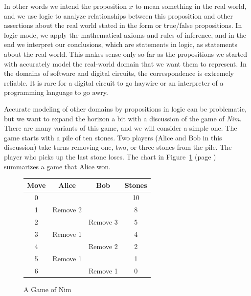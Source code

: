 {{In other words we intend the proposition $x$
to mean something in the real world,
and we use logic to analyze relationships between this proposition and other
assertions about the real world stated in the form or true/false propositions.
In logic mode, we apply the mathematical axioms and rules of inference,
and in the end we interpret our conclusions, which are statements in logic,
as statements about the real world.
This makes sense only so far as the propositions we started with
accurately model the real-world domain that we want them to represent.
In the domains of software and digital circuits,
the correspondence is extremely reliable.
It is rare for a digital circuit to go haywire or an interpreter of
a programming language to go awry.

Accurate modeling of other domains by propositions in logic can be problematic,
but we want to expand the horizon a bit with a discussion
of the game of \emph{Nim}.
There are many variants of this game, and we will consider a simple one.
The game starts with a pile of ten stones. Two players (Alice and Bob in this discussion)
take turns removing one, two, or three stones from the pile.
The player who picks up the last stone loses.
The chart in
Figure~\ref{fig:example-nim-game} (page \pageref{fig:example-nim-game})
summarizes a game that Alice won.

\begin{figure}
\begin{center}
\begin{tabular}{c|c|c|c}
Move & Alice     & Bob      & Stones \\
\hline
0    &           &          & 10     \\
1    & Remove 2  &          & 8      \\
2    &           & Remove 3 & 5      \\
3    & Remove 1  &          & 4      \\
4    &           & Remove 2 & 2      \\
5    & Remove 1  &          & 1      \\
6    &           & Remove 1 & 0      \\
\end{tabular}
\end{center}
\caption{A Game of Nim}
\label{fig:example-nim-game}
\end{figure}

}}
